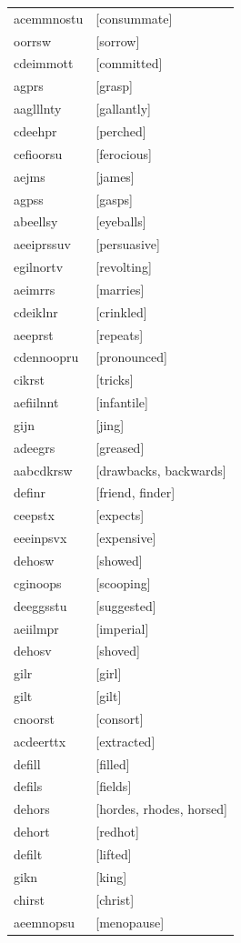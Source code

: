 \documentclass{article}
\begin{document}
\begin{tabular}{ll}
acemmnostu & [consummate] \\
oorrsw & [sorrow] \\
cdeimmott & [committed] \\
agprs & [grasp] \\
aaglllnty & [gallantly] \\
cdeehpr & [perched] \\
cefioorsu & [ferocious] \\
aejms & [james] \\
agpss & [gasps] \\
abeellsy & [eyeballs] \\
aeeiprssuv & [persuasive] \\
egilnortv & [revolting] \\
aeimrrs & [marries] \\
cdeiklnr & [crinkled] \\
aeeprst & [repeats] \\
cdennoopru & [pronounced] \\
cikrst & [tricks] \\
aefiilnnt & [infantile] \\
gijn & [jing] \\
adeegrs & [greased] \\
aabcdkrsw & [drawbacks, backwards] \\
definr & [friend, finder] \\
ceepstx & [expects] \\
eeeinpsvx & [expensive] \\
dehosw & [showed] \\
cginoops & [scooping] \\
deeggsstu & [suggested] \\
aeiilmpr & [imperial] \\
dehosv & [shoved] \\
gilr & [girl] \\
gilt & [gilt] \\
cnoorst & [consort] \\
acdeerttx & [extracted] \\
defill & [filled] \\
defils & [fields] \\
dehors & [hordes, rhodes, horsed] \\
dehort & [redhot] \\
defilt & [lifted] \\
gikn & [king] \\
chirst & [christ] \\
aeemnopsu & [menopause] \\

\end{tabular}
\end{document}
